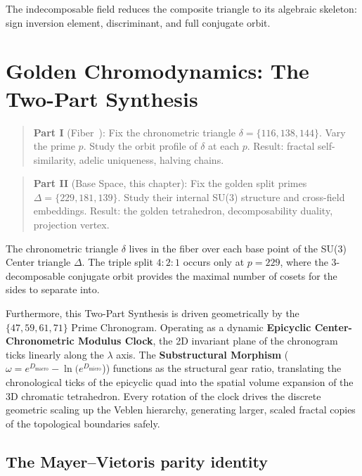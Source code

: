 \documentclass[12pt,oneside]{article}
\theoremstyle{principia}
\theoremstyle{definition}
\theoremstyle{remark}
\begin{document}
The indecomposable field reduces the composite triangle to its
algebraic skeleton: sign inversion element, discriminant, and full
conjugate orbit.

\section{Golden Chromodynamics: The Two-Part Synthesis}
\label{sec:synthesis}

\begin{quote}
\textbf{Part I} (Fiber~\cite{dwm_fst}): Fix the chronometric triangle
$\delta = \{116, 138, 144\}$.
Vary the prime $p$. Study the orbit profile of $\delta$ at
each $p$. Result: fractal self-similarity, adelic uniqueness,
halving chains.
\end{quote}

\begin{quote}
\textbf{Part II} (Base Space, this chapter): Fix the golden split primes
$\Delta = \{229, 181, 139\}$.
Study their internal SU(3) structure and cross-field embeddings.
Result: the golden tetrahedron, decomposability duality,
projection vertex.
\end{quote}

The chronometric triangle $\delta$ lives in the fiber over each base point of the SU(3) Center triangle $\Delta$. The triple split $4:2:1$ occurs only at $p = 229$, where the 3-decomposable conjugate orbit provides the maximal number of cosets for the sides to separate into.

Furthermore, this Two-Part Synthesis is driven geometrically by the $\{47, 59, 61, 71\}$ Prime Chronogram. Operating as a dynamic \textbf{Epicyclic Center-Chronometric Modulus Clock}, the 2D invariant plane of the chronogram ticks linearly along the $\lambda$ axis. The \textbf{Substructural Morphism} ($\omega = e^{D_{\text{macro}}} - \ln(e^{D_{\text{micro}}}$)) functions as the structural gear ratio, translating the chronological ticks of the epicyclic quad into the spatial volume expansion of the 3D chromatic tetrahedron. Every rotation of the clock drives the discrete geometric scaling up the Veblen hierarchy, generating larger, scaled fractal copies of the topological boundaries safely.

\subsection{The Mayer--Vietoris parity identity}
\label{sec:mv_parity}
\end{document}
